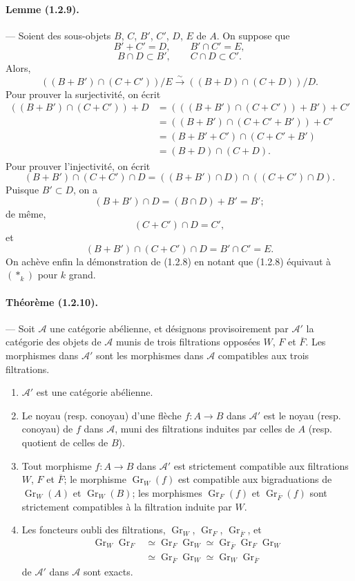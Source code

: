 \documentclass[10pt]{article}
\newcommand{\Gr}{\operatorname{Gr}}
\newcommand{\fg}{\guillemotright}
\newcommand{\og}{\guillemotleft}
\newcommand{\calA}{\mathcal A}
\newcommand{\iso}{\xrightarrow{\sim}}
\begin{document}
\paragraph{Lemme (1.2.9).} --- Soient des sous-objets $B$, $C$, $B'$, $C'$, $D$, $E$ de $A$. On suppose que
\[
B'+C'=D,
\qquad
B'\cap C'=E,
\]
\[
B\cap D\subset B',
\qquad
C\cap D\subset C'.
\]
Alors,
\[
((B+B')\cap(C+C'))/E\iso((B+D)\cap(C+D))/D.
\]
Pour prouver la surjectivité, on écrit
\begin{align*}
((B+B')\cap(C+C'))+D
&=(((B+B')\cap(C+C'))+B')+C'\\
&=((B+B')\cap(C+C'+B'))+C'\\
&=(B+B'+C')\cap(C+C'+B')\\
&=(B+D)\cap(C+D).
\end{align*}
Pour prouver l'injectivité, on écrit
\[
(B+B')\cap(C+C')\cap D=((B+B')\cap D)\cap((C+C')\cap D).
\]
Puisque $B'\subset D$, on a
\[
(B+B')\cap D=(B\cap D)+B'=B';
\]
de même,
\[
(C+C')\cap D=C',
\]
et
\[
(B+B')\cap(C+C')\cap D=B'\cap C'=E.
\]
On achève enfin la démonstration de (1.2.8) en notant que (1.2.8) équivaut à $(*_k)$ pour $k$ grand.

\paragraph{Théorème (1.2.10).} --- Soit $\calA$ une catégorie abélienne, et désignons provisoirement par $\calA'$ la catégorie des objets de $\calA$ munis de trois filtrations opposées $W$, $F$ et $\overline F$. Les morphismes dans $\calA'$ sont les morphismes dans $\calA$ compatibles aux trois filtrations.
\begin{enumerate}[label=(\roman*)]
\item $\calA'$ est une catégorie abélienne.
\item Le noyau (resp. conoyau) d'une flèche $f:A\to B$ dans $\calA'$ est le noyau (resp. conoyau) de $f$ dans $\calA$, muni des filtrations induites par celles de $A$ (resp. quotient de celles de $B$).
\item Tout morphisme $f:A\to B$ dans $\calA'$ est strictement compatible aux filtrations $W$, $F$ et $\overline F$; le morphisme $\Gr_W(f)$ est compatible aux bigraduations de $\Gr_W(A)$ et $\Gr_W(B)$; les morphismes $\Gr_F(f)$ et $\Gr_{\overline F}(f)$ sont strictement compatibles à la filtration induite par $W$.
\item Les foncteurs \og oubli des filtrations\fg{}, $\Gr_W$, $\Gr_F$, $\Gr_{\overline F}$, et
\[
\begin{aligned}
\Gr_W\Gr_F&\simeq\Gr_F\Gr_W\simeq\Gr_{\overline F}\Gr_F\Gr_W\\
&\simeq\Gr_{\overline F}\Gr_W\simeq\Gr_W\Gr_{\overline F}
\end{aligned}
\]
de $\calA'$ dans $\calA$ sont exacts.
\end{enumerate}
\end{document}
